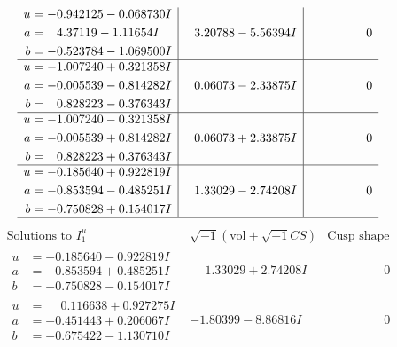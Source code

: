 \documentclass[1p]{elsarticle_modified}
\theoremstyle{definition}
\newcommand{\I}{\sqrt{-1}}
\begin{document}
$$\begin{array}{c|c|c}
\begin{aligned}
u &= -0.942125 - 0.068730 I \\
a &= \phantom{-}4.37119 - 1.11654 I \\
b &= -0.523784 - 1.069500 I\end{aligned}
 & \phantom{-}3.20788 - 5.56394 I & \phantom{-0.000000 } 0 \\ \hline\begin{aligned}
u &= -1.007240 + 0.321358 I \\
a &= -0.005539 - 0.814282 I \\
b &= \phantom{-}0.828223 - 0.376343 I\end{aligned}
 & \phantom{-}0.06073 - 2.33875 I & \phantom{-0.000000 } 0 \\ \hline\begin{aligned}
u &= -1.007240 - 0.321358 I \\
a &= -0.005539 + 0.814282 I \\
b &= \phantom{-}0.828223 + 0.376343 I\end{aligned}
 & \phantom{-}0.06073 + 2.33875 I & \phantom{-0.000000 } 0 \\ \hline\begin{aligned}
u &= -0.185640 + 0.922819 I \\
a &= -0.853594 - 0.485251 I \\
b &= -0.750828 + 0.154017 I\end{aligned}
 & \phantom{-}1.33029 - 2.74208 I & \phantom{-0.000000 } 0\\
 \hline 
 \end{array}$$\newpage$$\begin{array}{c|c|c}  
\text{Solutions to }I^u_{1}& \I (\text{vol} + \sqrt{-1}CS) & \text{Cusp shape}\\
 \hline 
\begin{aligned}
u &= -0.185640 - 0.922819 I \\
a &= -0.853594 + 0.485251 I \\
b &= -0.750828 - 0.154017 I\end{aligned}
 & \phantom{-}1.33029 + 2.74208 I & \phantom{-0.000000 } 0 \\ \hline\begin{aligned}
u &= \phantom{-}0.116638 + 0.927275 I \\
a &= -0.451443 + 0.206067 I \\
b &= -0.675422 - 1.130710 I\end{aligned}
 & -1.80399 - 8.86816 I & \phantom{-0.000000 } 0 \\ \hline\begin{aligned}

\end{aligned}
\end{array}$$
\end{document}
